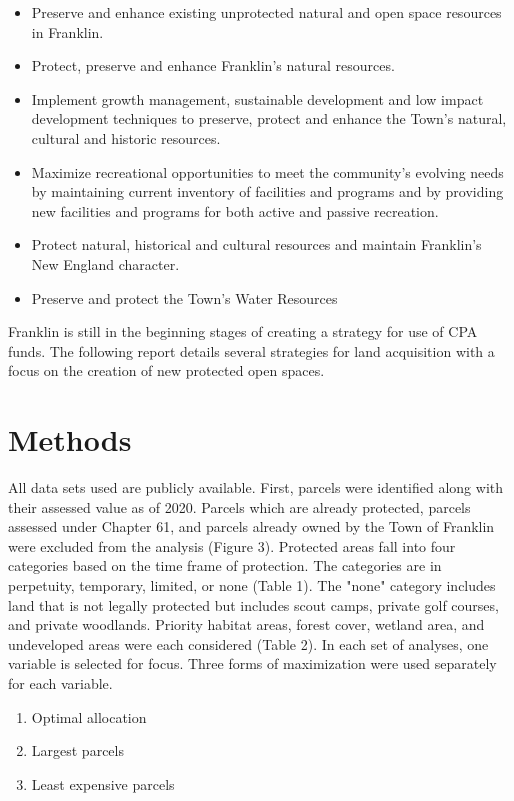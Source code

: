 \documentclass[12pt, stu, floatsintext,table]{apa7}
\begin{document}
\begin{itemize}
\setlength\itemsep{0.0em}
    \item Preserve and enhance existing unprotected natural and open space resources in Franklin.
    \item Protect, preserve and enhance Franklin’s natural resources.
    \item Implement growth management, sustainable development and low impact development techniques to preserve, protect and enhance the Town's natural, cultural and historic resources.
     \item Maximize recreational opportunities to meet the community’s evolving needs by maintaining current inventory of facilities and programs and by providing new facilities and programs for both active and passive recreation.
    \item  Protect natural, historical and cultural resources and maintain Franklin's New England character.
\item Preserve and protect the Town’s Water Resources
\end{itemize}  
Franklin is still in the beginning stages of creating a strategy for use of CPA funds. The following report details several strategies for land acquisition with a focus on the creation of new protected open spaces. 


\section{Methods}  
All data sets used are publicly available. First, parcels were identified along with their assessed value as of 2020. Parcels which are already protected, parcels assessed under Chapter 61, and parcels already owned by the Town of Franklin were excluded from the analysis (Figure 3). Protected areas fall into four categories based on the time frame of protection. The categories are in perpetuity, temporary, limited, or none (Table 1). The "none" category includes land that is not legally protected but includes scout camps, private golf courses, and private woodlands. Priority habitat areas, forest cover, wetland area, and undeveloped areas were each considered (Table 2). In each set of analyses, one variable is selected for focus. Three forms of maximization were used separately for each variable. 
\begin{enumerate}
    \item Optimal allocation
    \item Largest parcels
    \item Least expensive parcels
\end{enumerate}  
\end{document}
